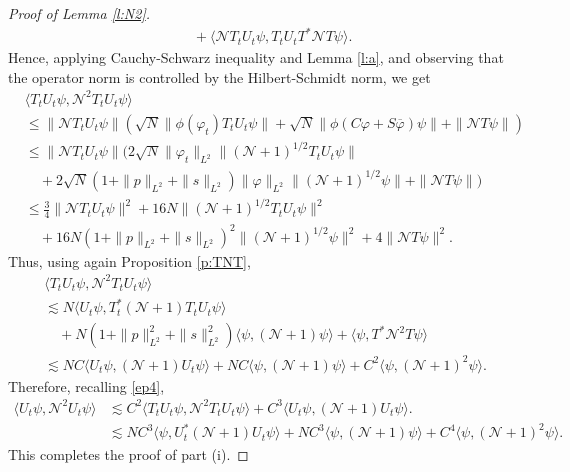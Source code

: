 \documentclass[11pt,a4paper]{scrartcl}
\newcommand{\N}{\mathcal{N}}
\begin{document}
\begin{proof}[Proof of Lemma \ref{l:N2}]
\begin{align*}
    & \quad + \langle \N T_t U_t \psi, T_t U_t T^* \N T \psi \rangle.
  \end{align*}
  Hence, applying Cauchy-Schwarz inequality and Lemma \ref{l:a}, and observing
  that the operator norm is controlled by the Hilbert-Schmidt norm, we get
  \begin{align*}
    & \langle T_t U_t \psi, \N^2 T_t U_t \psi \rangle \\
    & \le \| \N T_t U_t \psi \| ( \sqrt{N} \| \phi(\varphi_t) T_t U_t \psi \|
    + \sqrt{N} \| \phi(C \varphi + S \overline{\varphi}) \psi \| + \| \N T
    \psi \| ) \\
    & \le \| \N T_t U_t \psi \| ( 2 \sqrt{N} \| \varphi_t \|_{L^2} \|
    (\N+1)^{1/2} T_t U_t \psi \| \\
    & \quad + 2 \sqrt{N} ( 1 + \| p \|_{L^2} + \| s \|_{L^2}) \| \varphi
    \|_{L^2} \| (\N+1)^{1/2} \psi \| + \| \N T \psi \| ) \\
    & \le \frac{3}{4} \| \N T_t U_t \psi \|^2 + 16N \| (\N + 1)^{1/2} T_t U_t
    \psi \|^2 \\
    & \quad + 16N (1 + \| p \|_{L^2} + \| s \|_{L^2})^2 \| (\N + 1)^{1/2} \psi
    \|^2 + 4\| \N T \psi \|^2.
  \end{align*}
  Thus, using again Proposition \ref{p:TNT},
  \begin{align*}
    & \langle T_t U_t \psi, \N^2 T_t U_t \psi \rangle \\
    & \apprle N \langle U_t \psi, T_t^* (\N+1) T_t U_t \psi \rangle \\
    & \quad + N (1 + \| p \|_{L^2}^2 + \| s \|_{L^2}^2) \langle \psi, (\N+1)
    \psi \rangle + \langle \psi, T^* \N^2 T \psi \rangle \\
    & \apprle N C \langle U_t \psi, (\N+1) U_t \psi \rangle + N C \langle
    \psi, (\N+1) \psi \rangle + C^2 \langle \psi, (\N+1)^2 \psi \rangle.
  \end{align*}
  Therefore, recalling \eqref{ep4},
  \begin{align*}
    \langle U_t \psi, \N^2 U_t \psi \rangle 
    & \apprle C^2 \langle T_t U_t \psi, \N^2 T_t U_t \psi \rangle + C^3
    \langle U_t \psi, (\N+1) U_t \psi \rangle. \\
    & \apprle N C^3 \langle \psi, U_t^* (\N+1) U_t \psi \rangle + N C^3
    \langle \psi, (\N+1) \psi \rangle + C^4 \langle \psi, (\N+1)^2 \psi
    \rangle.
  \end{align*}
  This completes the proof of part (i).



\end{proof}
\end{document}
